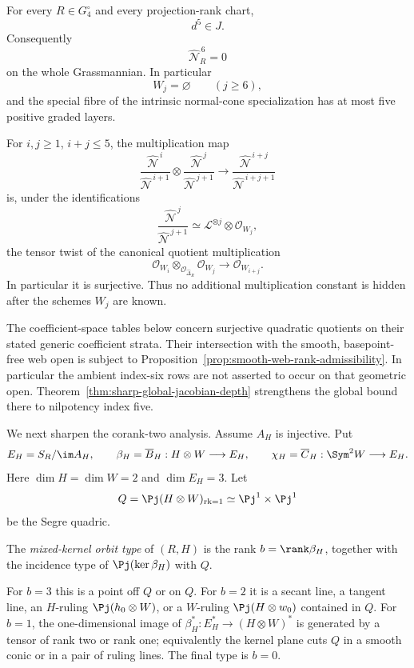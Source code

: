 \begin{theorem}
\label{thm:finite-all-corank-depth}
For every \(R\in G_4^\circ\) and every projection-rank chart,
\begin{equation}\label{eq:d5-in-J}
 d^5\in J.
\end{equation}
Consequently
\[
 \widehat{\mathcal N}_R^{\,6}=0
\]
on the whole Grassmannian.  In particular
\[
 W_j=\varnothing\qquad(j\ge6),
\]
and the special fibre of the intrinsic normal-cone specialization has
at most five positive graded layers.

For \(i,j\ge1\), \(i+j\le5\), the multiplication map
\[
 \frac{\widehat{\mathcal N}^{\,i}}
      {\widehat{\mathcal N}^{\,i+1}}
 \otimes
 \frac{\widehat{\mathcal N}^{\,j}}
      {\widehat{\mathcal N}^{\,j+1}}
 \longrightarrow
 \frac{\widehat{\mathcal N}^{\,i+j}}
      {\widehat{\mathcal N}^{\,i+j+1}}
\]
is, under the identifications
\[
 \frac{\widehat{\mathcal N}^{\,j}}
      {\widehat{\mathcal N}^{\,j+1}}
 \simeq
 \mathcal L^{\otimes j}\otimes\mathcal O_{W_j},
\]
the tensor twist of the canonical quotient multiplication
\begin{equation}\label{eq:atlas-multiplication}
 \mathcal O_{W_i}\otimes_{\mathcal O_{\widehat\Delta_R}}
 \mathcal O_{W_j}
 \longrightarrow
 \mathcal O_{W_{i+j}}.
\end{equation}
In particular it is surjective.  Thus no additional multiplication
constant is hidden after the schemes \(W_j\) are known.
\end{theorem}

The coefficient-space tables below concern surjective quadratic
quotients on their stated generic coefficient strata.  Their intersection
with the smooth, basepoint-free web open is subject to
Proposition~\ref{prop:smooth-web-rank-admissibility}.  In particular the
ambient index-six rows are not asserted to occur on that geometric open.
Theorem~\ref{thm:sharp-global-jacobian-depth} strengthens the global
bound there to nilpotency index five.

We next sharpen the corank-two analysis.  Assume \(A_H\) is
injective.  Put
\[
 E_H=S_R/\im A_H,\qquad
 \beta_H=\overline B_H:H\otimes W\longrightarrow E_H,\qquad
 \chi_H=\overline C_H:\Sym^2W\longrightarrow E_H.
\]
Here \(\dim H=\dim W=2\) and \(\dim E_H=3\).  Let
\[
 Q=\Pj(H\otimes W)_{\operatorname{rk}=1}
   \simeq\Pj^1\times\Pj^1
\]
be the Segre quadric.

\begin{definition}
\label{def:mixed-kernel-orbit-type}
The \emph{mixed-kernel orbit type} of \((R,H)\) is the rank
\(b=\rank\beta_H\), together with the incidence type of
\(\Pj(\ker\beta_H)\) with \(Q\).

For \(b=3\) this is a point off \(Q\) or on \(Q\).  For \(b=2\)
it is a secant line, a tangent line, an \(H\)-ruling
\(\Pj(h_0\otimes W)\), or a \(W\)-ruling
\(\Pj(H\otimes w_0)\) contained in \(Q\).  For \(b=1\), the one-dimensional image of
\(\beta_H^*:E_H^*\to(H\otimes W)^*\) is generated by a tensor of
rank two or rank one; equivalently the kernel plane cuts \(Q\) in a
smooth conic or in a pair of ruling lines.  The final type is
\(b=0\).
\end{definition}

